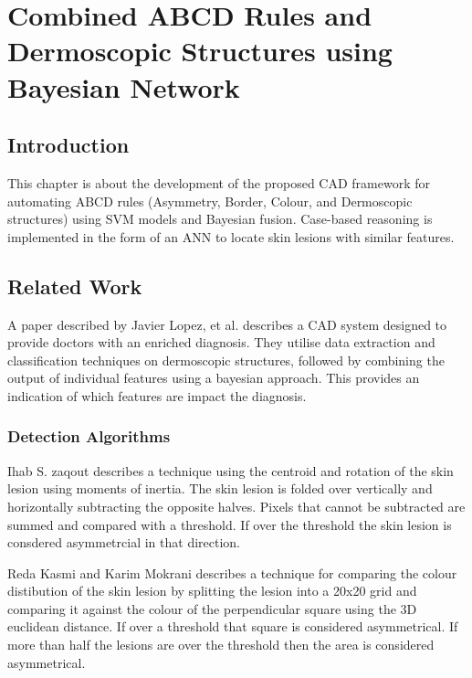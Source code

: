 \chapter{Combined ABCD Rules and Dermoscopic Structures using Bayesian Network}

\section{Introduction}
This chapter is about the development of the proposed CAD framework for automating ABCD rules (Asymmetry, Border, Colour, and Dermoscopic structures) using SVM models and Bayesian fusion. Case-based reasoning is implemented in the form of an ANN to locate skin lesions with similar features.

\section{Related Work}
A paper described by Javier Lopez, et al.\cite{Lopez-Labraca2018} describes a CAD system designed to provide doctors with an enriched diagnosis. They utilise data extraction and classification techniques on dermoscopic structures, followed by combining the output of individual features using a bayesian approach. This provides an indication of which features are impact the diagnosis.

\subsection{Detection Algorithms}
Ihab S. zaqout\cite{Zaqout2016} describes a technique using the centroid and rotation of the skin lesion using moments of inertia. The skin lesion is folded over vertically and horizontally subtracting the opposite halves. Pixels that cannot be subtracted are summed and compared with a threshold. If over the threshold the skin lesion is consdered asymmetrcial in that direction.

Reda Kasmi and Karim Mokrani\cite{Kasmi2016} describes a technique for comparing the colour distibution of the skin lesion by splitting the lesion into a 20x20 grid and comparing it against the colour of the perpendicular square using the 3D euclidean distance. If over a threshold that square is considered asymmetrical. If more than half the lesions are over the threshold then the area is considered asymmetrical.


